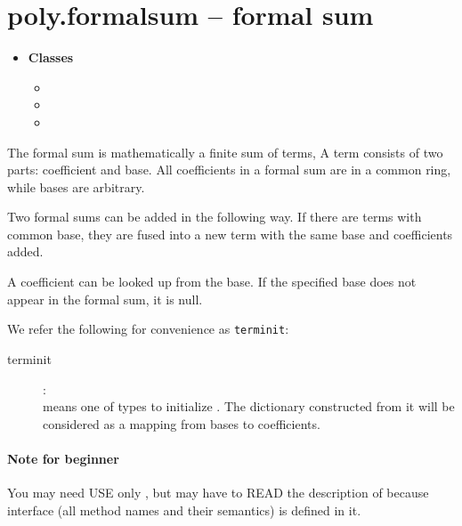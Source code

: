 

 \section{poly.formalsum -- formal sum}
 \begin{itemize}
   \item {\bf Classes}
   \begin{itemize}
     \item \negok{}
     \item {}
     \item \negok {}
   \end{itemize}
 \end{itemize}

 The formal sum is mathematically a finite sum of terms,
 A term consists of two parts: coefficient and base.
 All coefficients in a formal sum are in a common ring,
 while bases are arbitrary.

 Two formal sums can be added in the following way.
 If there are terms with common base, they are fused into a new
 term with the same base and coefficients added.

 A coefficient can be looked up from the base. If the specified base
 does not appear in the formal sum, it is null.

 We refer the following for convenience as {\tt terminit}:
 \begin{description}
   \item[terminit]:\\
      means one of types to initialize
     .  The dictionary
     constructed from it will be considered as a mapping from bases to
     coefficients.
 \end{description}

\paragraph{Note for beginner}
You may need USE only ,
but may have to READ the description of
 because
interface (all method names and their semantics) is defined in it.


